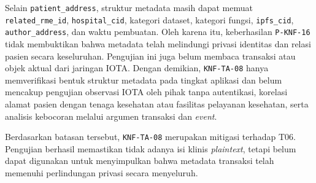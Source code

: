 Selain \texttt{patient\_address}, struktur metadata masih dapat memuat \texttt{related\_rme\_id}, \texttt{hospital\_cid}, kategori dataset, kategori fungsi, \texttt{ipfs\_cid}, \texttt{author\_address}, dan waktu pembuatan. Oleh karena itu, keberhasilan \texttt{P-KNF-16} tidak membuktikan bahwa metadata telah melindungi privasi identitas dan relasi pasien secara keseluruhan. Pengujian ini juga belum membaca transaksi atau objek aktual dari jaringan IOTA. Dengan demikian, \texttt{KNF-TA-08} hanya memverifikasi bentuk struktur metadata pada tingkat aplikasi dan belum mencakup pengujian observasi IOTA oleh pihak tanpa autentikasi, korelasi alamat pasien dengan tenaga kesehatan atau fasilitas pelayanan kesehatan, serta analisis kebocoran melalui argumen transaksi dan \textit{event}.

Berdasarkan batasan tersebut, \texttt{KNF-TA-08} merupakan mitigasi terhadap T06. Pengujian berhasil memastikan tidak adanya isi klinis \textit{plaintext}, tetapi belum dapat digunakan untuk menyimpulkan bahwa metadata transaksi telah memenuhi perlindungan privasi secara menyeluruh.